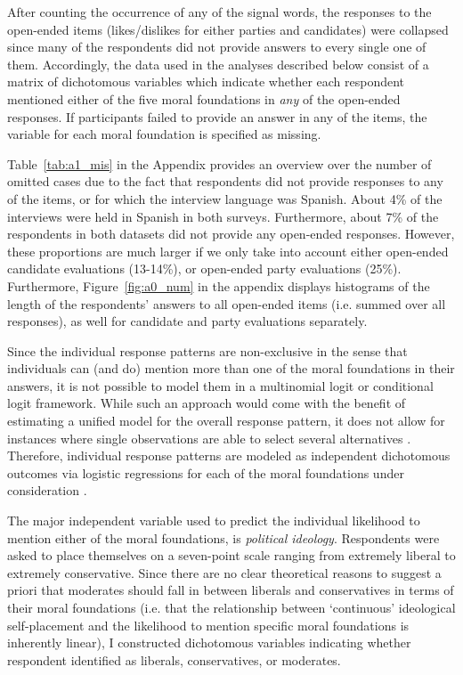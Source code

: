 \documentclass[12pt]{article}
\begin{document}
After counting the occurrence of any of the signal words, the responses to the open-ended items (likes/dislikes for either parties and candidates) were collapsed since many of the respondents did not provide answers to every single one of them. Accordingly, the data used in the analyses described below consist of a matrix of dichotomous variables which indicate whether each respondent mentioned either of the five moral foundations in \textit{any} of the open-ended responses. If participants failed to provide an answer in any of the items, the variable for each moral foundation is specified as missing.

Table~\ref{tab:a1_mis} in the Appendix provides an overview over the number of omitted cases due to the fact that respondents did not provide responses to any of the items, or for which the interview language was Spanish. About 4\% of the interviews were held in Spanish in both surveys. Furthermore, about 7\% of the respondents in both datasets did not provide any open-ended responses. However, these proportions are much larger if we only take into account either open-ended candidate evaluations (13-14\%), or open-ended party evaluations (25\%). Furthermore, Figure~\ref{fig:a0_num} in the appendix displays histograms of the length of the respondents' answers to all open-ended items (i.e. summed over all responses), as well for candidate and party evaluations separately.

Since the individual response patterns are non-exclusive in the sense that individuals can (and do) mention more than one of the moral foundations in their answers, it is not possible to model them in a multinomial logit or conditional logit framework. While such an approach would come with the benefit of estimating a unified model for the overall response pattern, it does not allow for instances where single observations are able to select several alternatives \citep[but see][]{gilbert2007models}. Therefore, individual response patterns are modeled as independent dichotomous outcomes via logistic regressions for each of the moral foundations under consideration \citep[c.f. for example][]{agresti1999modeling}.

The major independent variable used to predict the individual likelihood to mention either of the moral foundations, is \textit{political ideology}. Respondents were asked to place themselves on a seven-point scale ranging from extremely liberal to extremely conservative. Since there are no clear theoretical reasons to suggest a priori that moderates should fall in between liberals and conservatives in terms of their moral foundations (i.e. that the relationship between `continuous' ideological self-placement and the likelihood to mention specific moral foundations is inherently linear), I constructed dichotomous variables indicating whether respondent identified as liberals, conservatives, or moderates.
\end{document}
